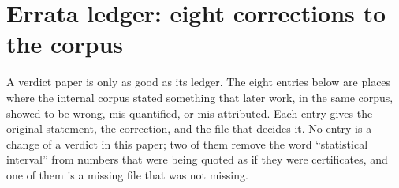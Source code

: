 \section{Errata ledger: eight corrections to the corpus}\label{sec:errata}

A verdict paper is only as good as its ledger. The eight entries below are places where the
internal corpus stated something that later work, in the same corpus, showed to be wrong,
mis-quantified, or mis-attributed. Each entry gives the original statement, the correction, and
the file that decides it. No entry is a change of a \LT{} verdict in this paper; two of them
remove the word ``statistical interval'' from numbers that were being quoted as if they were
certificates, and one of them is a missing file that was not missing.

